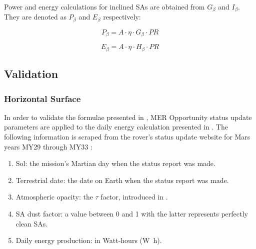 Power and energy calculations for inclined \acp{SA} are obtained from $G_{\beta}$ and $I_{\beta}$. They are denoted as $P_{\beta}$ and $E_{\beta}$ respectively:

\begin{equation}
  \label{eq:SA_slope_power}
  P_{\beta} = A \cdot \eta \cdot G_{\beta} \cdot PR
\end{equation}


\begin{equation}
  \label{eq:SA_slope_energy}
  E_{\beta} = A \cdot \eta \cdot H_{\beta} \cdot PR
\end{equation}

\subsection{Validation}
\label{sec:PowerAndEnergyPredictions:Validation}


\subsubsection{Horizontal Surface}
\label{sec:PowerAndEnergyPredictions:Validation:HorizontalSurface}

In order to validate the formulae presented in , \ac{MER} Opportunity status update parameters are applied to the daily energy calculation presented in . The following information is scraped from the rover's status update website for Mars years \ac{MY}29 through \ac{MY}33  :

\begin{enumerate}[label=\textcolor{BulletBlue}{(\alph*)}]
  \item Sol: the mission's Martian day when the status report was made.
  \item Terrestrial date: the date on Earth when the status report was made.
  \item Atmospheric opacity: the $\tau$ factor, introduced in  .
  \item \ac{SA} dust factor: a value between 0 and 1 with the latter represents perfectly clean \acp{SA}.
  \item Daily energy production: in Watt-hours (\si{\watt\hour}).
\end{enumerate}

